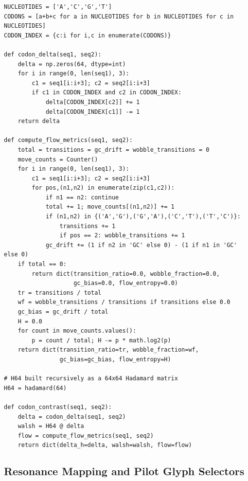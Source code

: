 \documentclass[11pt]{article}
\begin{document}
\begin{verbatim}
NUCLEOTIDES = ['A','C','G','T']
CODONS = [a+b+c for a in NUCLEOTIDES for b in NUCLEOTIDES for c in NUCLEOTIDES]
CODON_INDEX = {c:i for i,c in enumerate(CODONS)}

def codon_delta(seq1, seq2):
    delta = np.zeros(64, dtype=int)
    for i in range(0, len(seq1), 3):
        c1 = seq1[i:i+3]; c2 = seq2[i:i+3]
        if c1 in CODON_INDEX and c2 in CODON_INDEX:
            delta[CODON_INDEX[c2]] += 1
            delta[CODON_INDEX[c1]] -= 1
    return delta

def compute_flow_metrics(seq1, seq2):
    total = transitions = gc_drift = wobble_transitions = 0
    move_counts = Counter()
    for i in range(0, len(seq1), 3):
        c1 = seq1[i:i+3]; c2 = seq2[i:i+3]
        for pos,(n1,n2) in enumerate(zip(c1,c2)):
            if n1 == n2: continue
            total += 1; move_counts[(n1,n2)] += 1
            if (n1,n2) in {('A','G'),('G','A'),('C','T'),('T','C')}:
                transitions += 1
                if pos == 2: wobble_transitions += 1
            gc_drift += (1 if n2 in 'GC' else 0) - (1 if n1 in 'GC' else 0)
    if total == 0:
        return dict(transition_ratio=0.0, wobble_fraction=0.0,
                    gc_bias=0.0, flow_entropy=0.0)
    tr = transitions / total
    wf = wobble_transitions / transitions if transitions else 0.0
    gc_bias = gc_drift / total
    H = 0.0
    for count in move_counts.values():
        p = count / total; H -= p * math.log2(p)
    return dict(transition_ratio=tr, wobble_fraction=wf,
                gc_bias=gc_bias, flow_entropy=H)

# H64 built recursively as a 64x64 Hadamard matrix
H64 = hadamard(64)

def codon_contrast(seq1, seq2):
    delta = codon_delta(seq1, seq2)
    walsh = H64 @ delta
    flow = compute_flow_metrics(seq1, seq2)
    return dict(delta_h=delta, walsh=walsh, flow=flow)
\end{verbatim}

\subsection{Resonance Mapping and Pilot Glyph Selectors}
\end{document}
